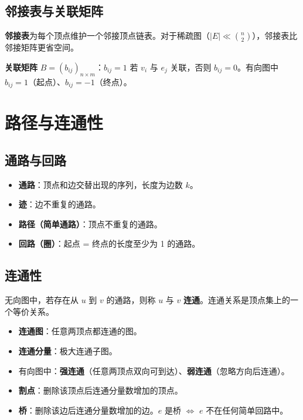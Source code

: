 \subsection{邻接表与关联矩阵}

\textbf{邻接表}为每个顶点维护一个邻接顶点链表。对于稀疏图（$|E| \ll \binom{n}{2}$），邻接表比邻接矩阵更省空间。

\textbf{关联矩阵} $B = (b_{ij})_{n \times m}$：$b_{ij} = 1$ 若 $v_i$ 与 $e_j$ 关联，否则 $b_{ij} = 0$。有向图中 $b_{ij} = 1$（起点）、$b_{ij} = -1$（终点）。

\section{路径与连通性}

\subsection{通路与回路}

\begin{mydefinition}{}
\begin{itemize}
    \item \textbf{通路}：顶点和边交替出现的序列，长度为边数 $k$。
    \item \textbf{迹}：边不重复的通路。
    \item \textbf{路径（简单通路）}：顶点不重复的通路。
    \item \textbf{回路（圈）}：起点 = 终点的长度至少为 1 的通路。
\end{itemize}
\end{mydefinition}

\subsection{连通性}

\begin{mydefinition}{}
无向图中，若存在从 $u$ 到 $v$ 的通路，则称 $u$ 与 $v$ \textbf{连通}。连通关系是顶点集上的一个等价关系。
\end{mydefinition}

\begin{itemize}
    \item \textbf{连通图}：任意两顶点都连通的图。
    \item \textbf{连通分量}：极大连通子图。
    \item 有向图中：\textbf{强连通}（任意两顶点双向可到达）、\textbf{弱连通}（忽略方向后连通）。
    \item \textbf{割点}：删除该顶点后连通分量数增加的顶点。
    \item \textbf{桥}：删除该边后连通分量数增加的边。$e$ 是桥 $\iff$ $e$ 不在任何简单回路中。
\end{itemize}

